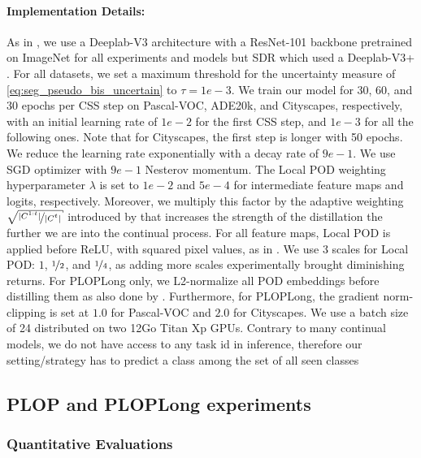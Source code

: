 \paragraph{Implementation Details:} As in \cite{cermelli2020modelingthebackground}, we use a
Deeplab-V3 \citep{chen2017deeplabv3} architecture with a ResNet-101 \citep{he2016resnet} backbone
pretrained on ImageNet \citep{deng2009imagenet} for all experiments and models but SDR
\citep{michieli2021sdr} which used a Deeplab-V3+ \citep{chen2018deeplabv3plus}. For all datasets, we
set a maximum threshold for the uncertainty measure of \autoref{eq:seg_pseudo_bis_uncertain} to
$\tau=1e-3$. We train our model for 30, 60, and 30 epochs per \ac{CSS} step on Pascal-VOC, ADE20k, and
Cityscapes, respectively, with an initial learning rate of $1e-2$ for the first \ac{CSS} step, and $1e-3$
for all the following ones. Note that for Cityscapes, the first step is longer with 50 epochs. We
reduce the learning rate exponentially with a decay rate of $9e-1$. We use SGD optimizer with $9e-1$
Nesterov momentum. The Local POD weighting hyperparameter $\lambda$ is set to $1e-2$ and $5e-4$ for
intermediate feature maps and logits, respectively. Moreover, we multiply this factor by the
adaptive weighting $\sqrt{\nicefrac{|C^{1:t}|}{|C^{t}|}}$ introduced by \citep{hou2019ucir} that
increases the strength of the distillation the further we are into the continual process. For all
feature maps, Local POD is applied before ReLU, with squared pixel values, as in
\cite{zagoruyko2016distillation_attention,douillard2020podnet}. We use 3 scales for Local POD: $1$,
$\nicefrac{1}{2}$, and $\nicefrac{1}{4}$, as adding more scales experimentally brought diminishing
returns. For PLOPLong only, we L2-normalize all POD embeddings before distilling them as also done
by \cite{douillard2020podnet}. Furthermore, for PLOPLong, the gradient norm-clipping is set at $1.0$
for Pascal-VOC and $2.0$ for Cityscapes. We use a batch size of 24 distributed on two 12Go Titan Xp
GPUs. Contrary to many continual models, we do not have access to any task id in inference, therefore
our setting/strategy has to predict a class among the set of all seen classes




\subsection{PLOP and PLOPLong experiments}
\label{sec:seg_plop_exp}

\subsubsection{Quantitative Evaluations}

